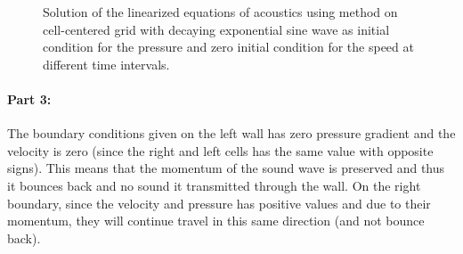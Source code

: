 \begin{figure}[]
     \caption{Solution of the linearized equations of acoustics using \protect{\lw} method on cell-centered grid with decaying exponential sine wave as initial condition for the pressure and zero initial condition for the speed at different time intervals.}
   \label{fig:sol_sin_expo}
\end{figure} 


\paragraph{Part 3:} 
The boundary conditions given on the left wall has zero pressure gradient and the velocity is zero (since the right and left cells has the same value with opposite signs). This means that the momentum of the sound wave is preserved and thus it bounces back and no sound it transmitted through the wall. On the right boundary, since the velocity and pressure has positive values and due to their momentum, they will continue travel in this same direction (and not bounce back). 

